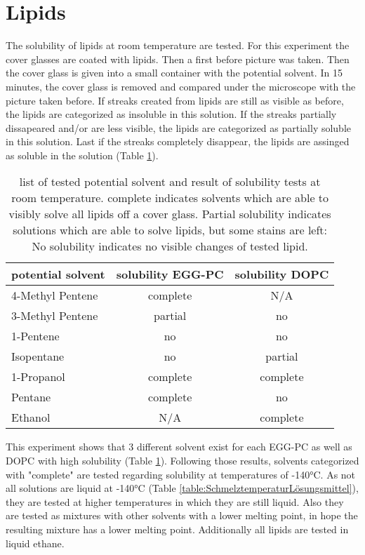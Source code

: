 

\section{Lipids}

The solubility of lipids at room temperature are tested. For this experiment the cover glasses are coated with lipids. Then a first before picture was taken. Then the cover glass is given into a small container with the potential solvent. In 15 minutes, the cover glass is removed and compared under the microscope with the picture taken before. If streaks created from lipids are still as visible as before, the lipids are categorized as insoluble in this solution. If the streaks partially dissapeared and/or are less visible, the lipids are categorized as partially soluble in this solution. Last if the streaks completely disappear, the lipids are assinged as soluble in the solution (Table \ref{table:LoeslichkeitRaumtemperatur}).


\begin{table}[hbt!]
	\centering
	\begin{tabular}{|l|c|c|}
		\hline
		potential solvent & solubility EGG-PC & solubility DOPC \\
		\hline
		\hline
		4-Methyl Pentene & complete & N/A  \\ 
		\hline
		3-Methyl Pentene & partial & no \\
		\hline
		1-Pentene & no & no \\
		\hline
		Isopentane & no & partial\\
		\hline
		1-Propanol & complete & complete\\
		\hline
		Pentane & complete & no\\
		\hline
		Ethanol & N/A & complete\\
		\hline
	\end{tabular}
	\caption{list of tested potential solvent and result of solubility tests at room temperature. complete indicates solvents which are able to visibly solve all lipids off a cover glass. Partial solubility indicates solutions which are able to solve lipids, but some stains are left: No solubility indicates no visible changes of tested lipid.}
	\label{table:LoeslichkeitRaumtemperatur}
\end{table}

This experiment shows that 3 different solvent exist for each EGG-PC as well as DOPC with high solubility (Table \ref{table:LoeslichkeitRaumtemperatur}). Following those results, solvents categorized with "complete" are tested regarding solubility at temperatures of -140°C. As not all solutions are liquid at -140°C (Table \ref{table:SchmelztemperaturLösungsmittel}), they are tested at higher temperatures in which they are still liquid. Also they are tested as mixtures with other solvents with a lower melting point, in hope the resulting mixture has a lower melting point. Additionally all lipids are tested in liquid ethane.

